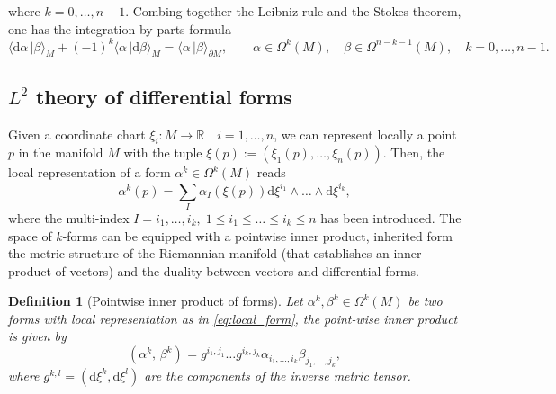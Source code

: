 \documentclass{elsarticle}
\newcommand{\revTwo}[1]{{\color{black}#1}}
\newtheorem{definition}{Definition}
\renewcommand\d{\ensuremath{\mathrm{d}}}
\newcommand{\bbR}{\mathbb{R}}
\newcommand{\inpr}[3][]{\ensuremath{( #2, \, #3 )_{#1}}}
\newcommand{\dualpr}[3][]{\ensuremath{\langle #2 \, \vert #3 \rangle_{#1}}}
\begin{document}
\revTwo{where $k=0, \dots, n-1$.}
Combing together the Leibniz rule and the Stokes theorem, one has the integration by parts formula 
\begin{equation}\label{eq:int_byparts_d}
    \dualpr[M]{\d\alpha}{\beta} + (-1)^k \dualpr[M]{\alpha}{\d\beta} = \dualpr[\partial M]{\alpha}{\beta}, \qquad \alpha \in \Omega^{k}(M), \quad \beta \in \Omega^{n-k-1}(M), \quad k=0, \dots, n-1.
\end{equation}


\subsection{$L^2$ theory of differential forms}
Given a coordinate chart $\xi_i:M \rightarrow \bbR \quad i=1, \dots, n$, we can represent locally a point $p$ in the manifold $M$ with the tuple $\xi(p) := (\xi_1(p), \dots, \xi_n(p))$.
Then, the local representation of a form $\alpha^k \in \Omega^k(M)$ reads
\begin{equation}\label{eq:local_form}
    \alpha^k(p) = \sum_I \alpha_I(\xi(p)) \d\xi^{i_1} \wedge \dots \wedge \d\xi^{i_k},
\end{equation}
where the multi-index $I= i_1, \dots, i_k, \; 1 \le i_1 \le \dots \le i_k \le n$ has been introduced. The space of $k$-forms can be equipped with a pointwise inner product, inherited form the metric structure of the Riemannian manifold (that establishes an inner product of vectors) and the duality between vectors and differential forms. 

\begin{definition}[Pointwise inner product of forms]\label{eq:local_inpr}
Let $\alpha^k, \beta^k \in \Omega^k(M)$ be two forms with local representation as in \eqref{eq:local_form}, the point-wise inner product is given by
\begin{equation}
    \inpr{\alpha^k}{\beta^k} = g^{i_1, j_1} \dots g^{i_k, j_k} \alpha_{i_1, \dots, i_k} \beta_{j_1, \dots, j_k},
\end{equation}
where $g^{k, l} = (\d\xi^k, \d\xi^l)$ are the components of the inverse metric tensor.
\end{definition}
\end{document}
